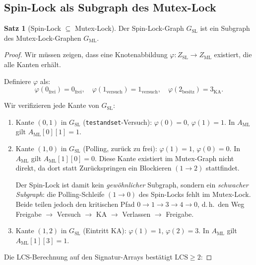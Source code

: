 ﻿\documentclass[a4paper,12pt]{article}
\theoremstyle{definition}
\newtheorem{satz}{Satz}
\begin{document}
\subsection{Spin-Lock als Subgraph des Mutex-Lock}

\begin{satz}[Spin-Lock $\subseteq$ Mutex-Lock]
  \label{satz:sl_ml}
  Der Spin-Lock-Graph $G_{\mathrm{SL}}$ ist ein Subgraph des
  Mutex-Lock-Graphen $G_{\mathrm{ML}}$.
\end{satz}

\begin{proof}
Wir müssen zeigen, dass eine Knotenabbildung
$\varphi: Z_{\mathrm{SL}} \to Z_{\mathrm{ML}}$ existiert, die alle Kanten
erhält.

Definiere $\varphi$ als:
\[
  \varphi(0_{\mathrm{frei}}) = 0_{\mathrm{frei}},\quad
  \varphi(1_{\mathrm{versuch}}) = 1_{\mathrm{versuch}},\quad
  \varphi(2_{\mathrm{besitz}}) = 3_{\mathrm{KA}}.
\]

Wir verifizieren jede Kante von $G_{\mathrm{SL}}$:

\begin{enumerate}
  \item Kante $(0, 1)$ in $G_{\mathrm{SL}}$ (\texttt{testandset}-Versuch):
        $\varphi(0) = 0$, $\varphi(1) = 1$.
        In $A_{\mathrm{ML}}$ gilt $A_{\mathrm{ML}}[0][1] = 1$.
        \checkmark

  \item Kante $(1, 0)$ in $G_{\mathrm{SL}}$ (Polling, zurück zu frei):
        $\varphi(1) = 1$, $\varphi(0) = 0$.
        In $A_{\mathrm{ML}}$ gilt $A_{\mathrm{ML}}[1][0] = 0$.
        Diese Kante existiert im Mutex-Graph nicht direkt, da dort statt
        Zurückspringen ein Blockieren $(1 \to 2)$ stattfindet.

        Der Spin-Lock ist damit kein \emph{gewöhnlicher} Subgraph, sondern
        ein \emph{schwacher Subgraph}: die Polling-Schleife $(1 \to 0)$ des
        Spin-Locks fehlt im Mutex-Lock. Beide teilen jedoch den kritischen
        Pfad $0 \to 1 \to 3 \to 4 \to 0$, d.\,h.\ den Weg
        Freigabe $\to$ Versuch $\to$ KA $\to$ Verlassen $\to$ Freigabe.

  \item Kante $(1, 2)$ in $G_{\mathrm{SL}}$ (Eintritt KA):
        $\varphi(1) = 1$, $\varphi(2) = 3$.
        In $A_{\mathrm{ML}}$ gilt $A_{\mathrm{ML}}[1][3] = 1$.
        \checkmark
\end{enumerate}

Die LCS-Berechnung auf den Signatur-Arrays bestätigt $\mathrm{LCS} \geq 2$:


\end{proof}
\end{document}
